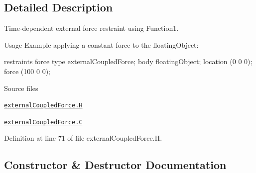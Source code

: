 \subsection{Detailed Description}
Time-\/dependent external force restraint using Function1. 

\label{_Description}%
 \begin{DoxyParagraph}{Usage}
Example applying a constant force to the floating\+Object\+: \begin{DoxyVerb}restraints
{
    force
    {
        type        externalCoupledForce;
        body        floatingObject;
        location    (0 0 0);
        force       (100 0 0);
    }
}
\end{DoxyVerb}

\end{DoxyParagraph}
\begin{DoxyParagraph}{Source files}

\begin{DoxyItemize}
\item \href{../../../home/carlo/data/GeN-Foam/GeN-Foam_ffn/GeN-Foam/GeN-Foam/FMU4FOAM/ECI4FOAM/src/externalComm/externalIO/input/meshMotion/externalCoupledForce/externalCoupledForce.H}{\tt external\+Coupled\+Force.\+H} 
\item \href{../../../home/carlo/data/GeN-Foam/GeN-Foam_ffn/GeN-Foam/GeN-Foam/FMU4FOAM/ECI4FOAM/src/externalComm/externalIO/input/meshMotion/externalCoupledForce/externalCoupledForce.C}{\tt external\+Coupled\+Force.\+C} 
\end{DoxyItemize}
\end{DoxyParagraph}


Definition at line 71 of file external\+Coupled\+Force.\+H.



\subsection{Constructor \& Destructor Documentation}
\mbox{\label{classFoam_1_1RBD_1_1restraints_1_1externalCoupledForce_adcd796f0ef95c09e380099face023ba1}} 
